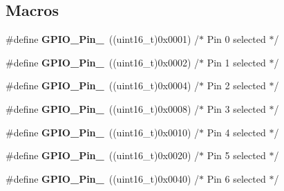 \subsection*{Macros}
\begin{DoxyCompactItemize}
\item 
\mbox{\label{group___g_p_i_o__pins__define_gab305b8d1be9f89bf2b4a05589b456049}} 
\#define {\bfseries G\+P\+I\+O\+\_\+\+Pin\+\_}~((uint16\+\_\+t)0x0001)  /$\ast$ Pin 0 selected $\ast$/
\item 
\mbox{\label{group___g_p_i_o__pins__define_ga29db642c26f1fa0fffc3ecadcd30f82b}} 
\#define {\bfseries G\+P\+I\+O\+\_\+\+Pin\+\_}~((uint16\+\_\+t)0x0002)  /$\ast$ Pin 1 selected $\ast$/
\item 
\mbox{\label{group___g_p_i_o__pins__define_gabdf6630324b2f99360537a310687187c}} 
\#define {\bfseries G\+P\+I\+O\+\_\+\+Pin\+\_}~((uint16\+\_\+t)0x0004)  /$\ast$ Pin 2 selected $\ast$/
\item 
\mbox{\label{group___g_p_i_o__pins__define_ga763c6544859dbe28cd3f8ad820045556}} 
\#define {\bfseries G\+P\+I\+O\+\_\+\+Pin\+\_}~((uint16\+\_\+t)0x0008)  /$\ast$ Pin 3 selected $\ast$/
\item 
\mbox{\label{group___g_p_i_o__pins__define_gacbf04d09b954606cdcc55eb2e81780e3}} 
\#define {\bfseries G\+P\+I\+O\+\_\+\+Pin\+\_}~((uint16\+\_\+t)0x0010)  /$\ast$ Pin 4 selected $\ast$/
\item 
\mbox{\label{group___g_p_i_o__pins__define_ga32dbe930f52ce5ab60190c65e9dc741e}} 
\#define {\bfseries G\+P\+I\+O\+\_\+\+Pin\+\_}~((uint16\+\_\+t)0x0020)  /$\ast$ Pin 5 selected $\ast$/
\item 
\mbox{\label{group___g_p_i_o__pins__define_gaf047899d873f27c2db9f50b342e35a58}} 
\#define {\bfseries G\+P\+I\+O\+\_\+\+Pin\+\_}~((uint16\+\_\+t)0x0040)  /$\ast$ Pin 6 selected $\ast$/
\item 
\mbox{\label{group___g_p_i_o__pins__define_ga7346b6ce5507bd28a7a79e7dcc816c08}} 

\end{DoxyCompactItemize}
